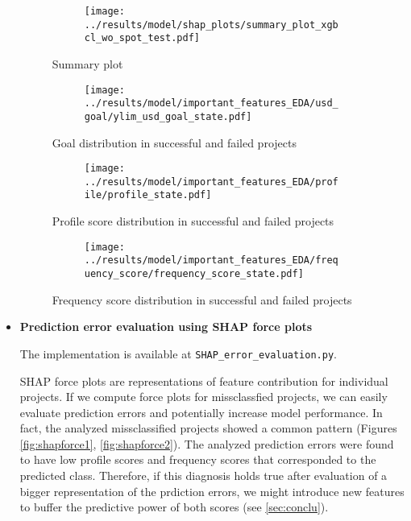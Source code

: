 \documentclass{article}
\begin{document}
\begin{itemize}
\begin{figure}
  \begin{subfigure}{1\linewidth}
    \centering\texttt{[image: ../results/model/shap\_plots/summary\_plot\_xgbcl\_wo\_spot\_test.pdf]}
  \end{subfigure}
\caption{Summary plot}
\label{fig:shapSummary}
\end{figure}

\begin{figure}
  \begin{subfigure}{1\linewidth}
    \centering\texttt{[image: ../results/model/important\_features\_EDA/usd\_goal/ylim\_usd\_goal\_state.pdf]}
  \end{subfigure}
\caption{Goal distribution in successful and failed projects}
\label{fig:goal}
\end{figure}

\begin{figure}
  \begin{subfigure}{1\linewidth}
    \centering\texttt{[image: ../results/model/important\_features\_EDA/profile/profile\_state.pdf]}
  \end{subfigure}
\caption{Profile score distribution in successful and failed projects}
\label{fig:profile}
\end{figure}

\begin{figure}
  \begin{subfigure}{1\linewidth}
    \centering\texttt{[image: ../results/model/important\_features\_EDA/frequency\_score/frequency\_score\_state.pdf]}
  \end{subfigure}
\caption{Frequency score distribution in successful and failed projects}
\label{fig:freq}
\end{figure}

\item \textbf{Prediction error evaluation using SHAP force plots}

The implementation is available at {\tt SHAP\_error\_evaluation.py}.

SHAP force plots are representations of feature contribution for individual projects. If we compute force plots for missclassfied projects, we can easily evaluate prediction errors and potentially increase model performance. In fact, the analyzed missclassified projects showed a common pattern (Figures \ref{fig:shapforce1}, \ref{fig:shapforce2}). The analyzed prediction errors were found to have low profile scores and frequency scores that corresponded to the predicted class. Therefore, if this diagnosis holds true after evaluation of a bigger representation of the prdiction errors, we might introduce new features to buffer the predictive power of both scores (see \ref{sec:conclu}).


\end{itemize}
\end{document}
